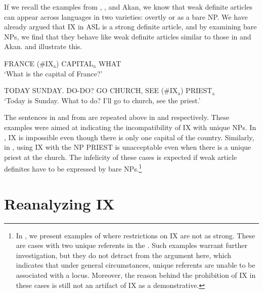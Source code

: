 \documentclass[output=paper,
modfonts
]{langscibook}
\begin{document}
If we recall the examples from , , and Akan, we know that weak definite articles can appear across languages in two varieties: overtly or as a bare NP. We have already argued that IX in ASL is a strong definite article, and by examining bare NPs, we find that they behave like weak definite articles similar to those in  and Akan.  and  illustrate this.  

\begin{exe}
\ex \label{ex:irani:33}FRANCE (\#IX$_\text{a}$) CAPITAL$_\text{a}$ WHAT \\
`What is the capital of France?’ \citep{KoulidobrovaLilloMartin2016}

\ex \label{ex:irani:34} TODAY SUNDAY. DO-DO? GO CHURCH, SEE (\#IX$_\text{a}$) PRIEST$_\text{a}$\\
`Today is Sunday. What to do? I’ll go to church, see the priest.' \\ \citep{KoulidobrovaLilloMartin2016}
\end{exe}

The sentences in  and  from \citet{KoulidobrovaLilloMartin2016} are repeated above in  and  respectively. These examples were aimed at indicating the incompatibility of IX with unique NPs. In , IX is impossible even though there is only one capital of the country. Similarly, in , using IX with the NP PRIEST is unacceptable even when there is a unique priest at the church. The infelicity of these cases is expected if weak article definites have to be expressed by bare NPs.\footnote{In , we present examples of where  restrictions on IX are not as strong. These are cases with two unique referents in the . Such examples warrant further investigation, but they do not detract from the argument here, which indicates that under general circumstances, unique referents are unable to be associated with a locus. Moreover, the reason behind the prohibition of IX in these cases is still not an artifact of IX as a demonstrative.} 

\section{Reanalyzing IX}
\end{document}
